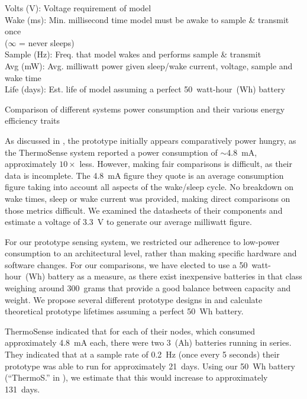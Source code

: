 \documentclass[../thesis/thesis.tex]{subfiles}
\begin{document}
\begin{table}
{{\begin{tabbing}
Volts (V): \> Voltage requirement of model\\
Wake (ms): \> Min. millisecond time model must be awake to sample \& transmit once\\
           \> ($\infty$ = never sleeps)\\
Sample (Hz): \> Freq. that model wakes and performs sample \& transmit\\
Avg (mW): \> Avg. milliwatt power given sleep/wake current, voltage, sample and wake time\\
Life (days): \> Est. life of model assuming a perfect 50~watt-hour~(Wh) battery
\end{tabbing}}}
\vspace*{-20px}
\caption{Comparison of different systems power consumption and their various energy efficiency traits}
\label{tab:lives}
\end{table}

As discussed in , the prototype initially appears comparatively power hungry, as the ThermoSense system reported a power consumption of $\sim$4.8~mA, approximately $10\times$ less. However, making fair comparisons is difficult, as their data is incomplete. The 4.8~mA figure they quote is an average consumption figure taking into account all aspects of the wake/sleep cycle. No breakdown on wake times, sleep or wake current was provided, making direct comparisons on those metrics difficult. We examined the datasheets of their components and estimate a voltage of 3.3~V to generate our average milliwatt figure.

For our prototype sensing system, we restricted our adherence to low-power consumption to an architectural level, rather than making specific hardware and software changes. For our comparisons, we have elected to use a 50~watt-hour~(Wh) battery as a measure, as there exist inexpensive batteries in that class weighing around 300~grams \cite{AdafruitBattery} that provide a good balance between capacity and weight. We propose several different prototype designs in  and calculate theoretical prototype lifetimes assuming a perfect 50~Wh battery.

ThermoSense indicated that for each of their nodes, which consumed approximately 4.8~mA each, there were two 3~(Ah) batteries running in series. They indicated that at a sample rate of 0.2~Hz (once every 5 seconds) their prototype was able to run for approximately 21~days. Using our 50~Wh battery (``ThermoS.'' in ), we estimate that this would increase to approximately 131~days.
\end{document}
